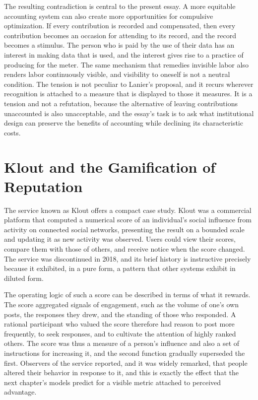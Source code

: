 \documentclass[11pt]{report}
\theoremstyle{definition}
\theoremstyle{remark}
\begin{document}
The resulting contradiction is central to the present essay. A more equitable accounting system can also create more opportunities for compulsive optimization. If every contribution is recorded and compensated, then every contribution becomes an occasion for attending to its record, and the record becomes a stimulus. The person who is paid by the use of their data has an interest in making data that is used, and the interest gives rise to a practice of producing for the meter. The same mechanism that remedies invisible labor also renders labor continuously visible, and visibility to oneself is not a neutral condition. The tension is not peculiar to Lanier's proposal, and it recurs wherever recognition is attached to a measure that is displayed to those it measures. It is a tension and not a refutation, because the alternative of leaving contributions unaccounted is also unacceptable, and the essay's task is to ask what institutional design can preserve the benefits of accounting while declining its characteristic costs.

\section{Klout and the Gamification of Reputation}

The service known as Klout offers a compact case study. Klout was a commercial platform that computed a numerical score of an individual's social influence from activity on connected social networks, presenting the result on a bounded scale and updating it as new activity was observed. Users could view their scores, compare them with those of others, and receive notice when the score changed. The service was discontinued in 2018, and its brief history is instructive precisely because it exhibited, in a pure form, a pattern that other systems exhibit in diluted form.

The operating logic of such a score can be described in terms of what it rewards. The score aggregated signals of engagement, such as the volume of one's own posts, the responses they drew, and the standing of those who responded. A rational participant who valued the score therefore had reason to post more frequently, to seek responses, and to cultivate the attention of highly ranked others. The score was thus a measure of a person's influence and also a set of instructions for increasing it, and the second function gradually superseded the first. Observers of the service reported, and it was widely remarked, that people altered their behavior in response to it, and this is exactly the effect that the next chapter's models predict for a visible metric attached to perceived advantage.
\end{document}
